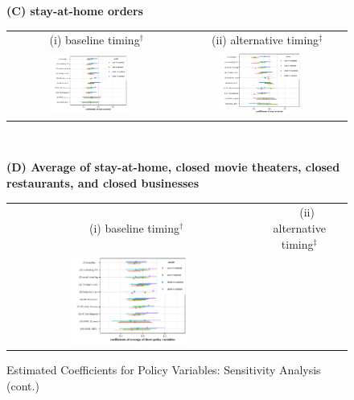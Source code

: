 \documentclass[11pt,reqno,letter]{amsart}
\theoremstyle{definition}
\begin{document}
   \addtocounter{figure}{-1}
\begin{figure}[ht]
  \caption{Estimated Coefficients for Policy Variables:  Sensitivity Analysis (cont.) \label{fig:whisker-2}}\bigskip
  \begin{minipage}{\linewidth}
    \centering
   {\textbf{(C)  stay-at-home orders}}\\
    \medskip
    \begin{tabular}{cc}  
 $\quad$  (i) baseline timing$^\dagger$ &$\quad$ (ii) alternative timing$^\ddagger$\\ 
      \includegraphics[width=0.5\textwidth]{tables_and_figures/pshelter-whisker-14}
      &
      \includegraphics[width=0.5\textwidth]{tables_and_figures/pshelter-whisker-7} 
    \end{tabular}
  \end{minipage} \\ \smallskip
    \begin{minipage}{\linewidth}
    \centering 
     {\textbf{(D)  Average of stay-at-home, closed movie theaters, closed restaurants, and closed  businesses}}\\
    \medskip
    \begin{tabular}{cc}  
 $\quad$  (i) baseline timing$^\dagger$ &$\quad$ (ii) alternative timing$^\ddagger$\\ 
      \includegraphics[width=0.5\textwidth]{tables_and_figures/pindex-whisker-14}

\end{tabular}
\end{minipage}
\end{figure}
\end{document}

